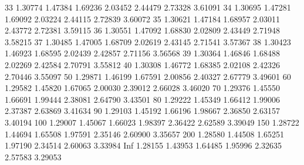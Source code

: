 \documentclass[onecolumn,12pt]{book}
\begin{document}
\begin{Schunk}
\begin{Soutput}
33  1.30774 1.47384 1.69236  2.03452  2.44479  2.73328   3.61091
34  1.30695 1.47281 1.69092  2.03224  2.44115  2.72839   3.60072
35  1.30621 1.47184 1.68957  2.03011  2.43772  2.72381   3.59115
36  1.30551 1.47092 1.68830  2.02809  2.43449  2.71948   3.58215
37  1.30485 1.47005 1.68709  2.02619  2.43145  2.71541   3.57367
38  1.30423 1.46923 1.68595  2.02439  2.42857  2.71156   3.56568
39  1.30364 1.46846 1.68488  2.02269  2.42584  2.70791   3.55812
40  1.30308 1.46772 1.68385  2.02108  2.42326  2.70446   3.55097
50  1.29871 1.46199 1.67591  2.00856  2.40327  2.67779   3.49601
60  1.29582 1.45820 1.67065  2.00030  2.39012  2.66028   3.46020
70  1.29376 1.45550 1.66691  1.99444  2.38081  2.64790   3.43501
80  1.29222 1.45349 1.66412  1.99006  2.37387  2.63869   3.41634
90  1.29103 1.45192 1.66196  1.98667  2.36850  2.63157   3.40194
100 1.29007 1.45067 1.66023  1.98397  2.36422  2.62589   3.39049
150 1.28722 1.44694 1.65508  1.97591  2.35146  2.60900   3.35657
200 1.28580 1.44508 1.65251  1.97190  2.34514  2.60063   3.33984
Inf 1.28155 1.43953 1.64485  1.95996  2.32635  2.57583   3.29053
\end{Soutput}
\end{Schunk}
  \normalsize
\end{document}
